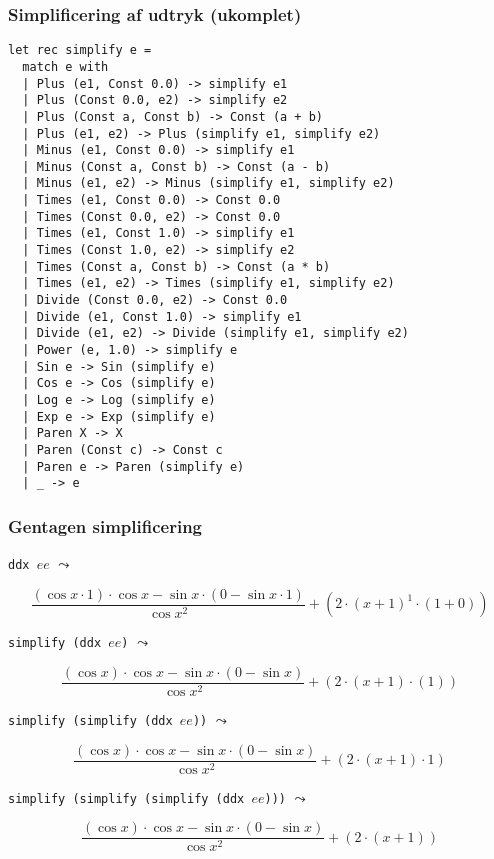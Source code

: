 \documentclass{beamer}
\begin{document}
\begin{frame}[fragile=singleslide]
\frametitle{Simplificering af udtryk (ukomplet)}

\renewcommand{\baselinestretch}{0.75}
{\footnotesize
\begin{verbatim}
let rec simplify e =
  match e with
  | Plus (e1, Const 0.0) -> simplify e1
  | Plus (Const 0.0, e2) -> simplify e2
  | Plus (Const a, Const b) -> Const (a + b)
  | Plus (e1, e2) -> Plus (simplify e1, simplify e2)
  | Minus (e1, Const 0.0) -> simplify e1
  | Minus (Const a, Const b) -> Const (a - b)
  | Minus (e1, e2) -> Minus (simplify e1, simplify e2)
  | Times (e1, Const 0.0) -> Const 0.0
  | Times (Const 0.0, e2) -> Const 0.0
  | Times (e1, Const 1.0) -> simplify e1
  | Times (Const 1.0, e2) -> simplify e2
  | Times (Const a, Const b) -> Const (a * b)
  | Times (e1, e2) -> Times (simplify e1, simplify e2)
  | Divide (Const 0.0, e2) -> Const 0.0
  | Divide (e1, Const 1.0) -> simplify e1
  | Divide (e1, e2) -> Divide (simplify e1, simplify e2)
  | Power (e, 1.0) -> simplify e
  | Sin e -> Sin (simplify e)
  | Cos e -> Cos (simplify e)
  | Log e -> Log (simplify e)
  | Exp e -> Exp (simplify e)
  | Paren X -> X
  | Paren (Const c) -> Const c
  | Paren e -> Paren (simplify e)
  | _ -> e
\end{verbatim}
}

\end{frame}

\begin{frame}%
\frametitle{Gentagen simplificering}

\texttt{ddx $ee$} $\leadsto$

\[
\frac{(\cos x\cdot 1)\cdot \cos x-\sin x\cdot (0-\sin x\cdot 1)}{\cos x^2}+(2\cdot (x+1)^1\cdot (1+0))
\]


\texttt{simplify (ddx $ee$)} $\leadsto$

\[
\frac{(\cos x)\cdot \cos x-\sin x\cdot (0-\sin x)}{\cos x^2}+(2\cdot (x+1)\cdot (1))
\]

\texttt{simplify (simplify (ddx $ee$))} $\leadsto$

\[
\frac{(\cos x)\cdot \cos x-\sin x\cdot (0-\sin x)}{\cos x^2}+(2\cdot (x+1)\cdot 1)
\]

\texttt{simplify (simplify (simplify (ddx $ee$)))} $\leadsto$

\[
\frac{(\cos x)\cdot \cos x-\sin x\cdot (0-\sin x)}{\cos x^2}+(2\cdot (x+1))
\]

\end{frame}
\end{document}

